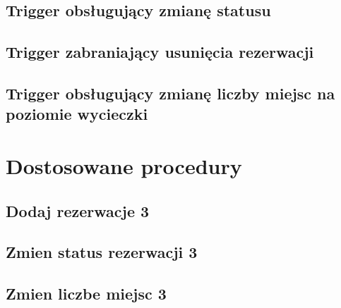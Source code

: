 \documentclass[12pt]{article}
\begin{document}
	\subsection{Trigger obsługujący zmianę statusu}
	
	
	\subsection{Trigger zabraniający usunięcia rezerwacji}
	
	
	\subsection{Trigger obsługujący zmianę liczby miejsc na poziomie wycieczki}
	
	
	\section{Dostosowane procedury}
	
	\subsection{Dodaj rezerwacje 3}
	
	
	\pagebreak
	
	\subsection{Zmien status rezerwacji 3}
	
	
	\pagebreak
	
	\subsection{Zmien liczbe miejsc 3}
	
	
\end{document}
